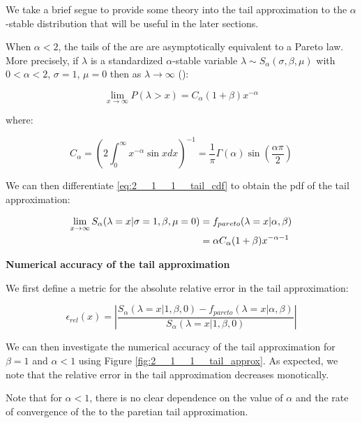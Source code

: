 \documentclass[../main.tex]{subfiles}
\begin{document}
We take a brief segue to provide some theory into the tail approximation to the $\alpha$-stable distribution that will be useful in the later sections. 

When $\alpha < 2$, the tails of the \asd are are asymptotically equivalent to a Pareto law. More precisely, if $\lambda$ is a standardized $\alpha$-stable variable $\lambda \sim S_\alpha(\sigma, \beta, \mu)$ with $0 < \alpha < 2$, $\sigma = 1$, $\mu = 0$ then as $\lambda \rightarrow \infty$ (\cite{samoradnitsky2017stable}):

\begin{equation}
	\lim_{x \rightarrow \infty} P(\lambda > x) = C_\alpha (1+\beta) x^{-\alpha}
	\label{eq:2__1__1__tail_cdf}
\end{equation}

where: 

\begin{equation*}
	C_\alpha = \left( 2\int_{0}^{\infty} x^{-\alpha} \sin x dx \right)^{-1} = \frac{1}{\pi}\Gamma(\alpha)\sin(\frac{\alpha \pi}{2})
\end{equation*}

We can then differentiate \autoref{eq:2__1__1__tail_cdf} to obtain the pdf of the tail approximation: 

\begin{align}
	\lim_{x \rightarrow \infty}S_\alpha(\lambda = x | \sigma = 1, \beta, \mu = 0) &= f_{pareto}(\lambda = x | \alpha, \beta) \notag \\
	&=  \alpha C_\alpha (1+\beta) x^{-\alpha - 1}
\end{align}

\textbf{Numerical accuracy of the tail approximation}

We first define a metric for the absolute relative error in the tail approximation: 

\begin{equation}
	\epsilon_{rel}(x) =  \left| \frac{ S_\alpha(\lambda = x | 1, \beta, 0) - f_{pareto}(\lambda = x | \alpha, \beta) }{S_\alpha(\lambda = x | 1, \beta, 0)  } \right|
\end{equation}

We can then investigate the numerical accuracy of the tail approximation for $\beta = 1$ and $\alpha < 1$ using Figure \ref{fig:2__1__1__tail_approx}. As expected, we note that the relative error in the tail approximation decreases monotically. 

Note that for $\alpha<1$, there is no clear dependence on the value of $\alpha$ and the rate of convergence of the \asd to the paretian tail approximation.
\end{document}

